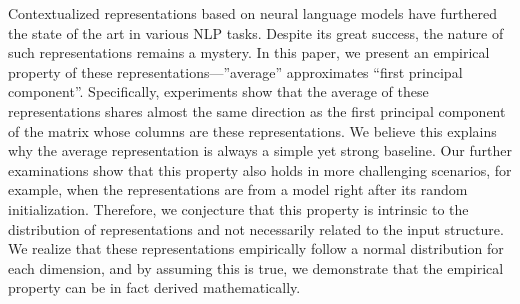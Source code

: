 Contextualized representations based on neural language models have furthered the state of the art in various NLP tasks. Despite its great success, the nature of such representations remains a mystery. In this paper, we present an empirical property of these representations---''average'' approximates ``first principal component''. Specifically, experiments show that the average of these representations shares almost the same direction as the first principal component of the matrix whose columns are these representations. We believe this explains why the average representation is always a simple yet strong baseline.  Our further examinations show that this property also holds in more challenging scenarios, for example, when the representations are from a model right after its random initialization. Therefore, we conjecture that this property is intrinsic to the distribution of representations and not necessarily related to the input structure. We realize that these representations empirically follow a normal distribution for each dimension, and by assuming this is true, we demonstrate that the empirical property can be in fact derived mathematically.
